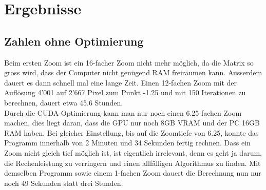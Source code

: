 \section{Ergebnisse}

\subsection{Zahlen ohne Optimierung}
Beim ersten Zoom ist ein 16-facher Zoom nicht mehr möglich, da die Matrix so gross wird, dass der Computer nicht genügend RAM freiräumen kann. Ausserdem dauert es dann schnell mal eine lange Zeit. Einen 12-fachen Zoom mit der Auflösung 4'001 auf 2'667 Pixel zum Punkt -1.25 und mit 150 Iterationen zu berechnen, dauert etwa 45.6 Stunden.\\
Durch die CUDA-Optimierung kann man nur noch einen 6.25-fachen Zoom machen, dies liegt daran, dass die GPU nur noch 8GB VRAM und der PC 16GB RAM haben. Bei gleicher Einstellung, bis auf die Zoomtiefe von 6.25, konnte das Programm innerhalb von 2 Minuten und 34 Sekunden fertig rechnen. Dass ein Zoom nicht gleich tief möglich ist, ist eigentlich irrelevant, denn es geht ja darum, die Rechenleistung zu verringern und einen allfälligen Algorithmus zu finden. Mit demselben Programm sowie einem 1-fachen Zoom dauert die Berechnung nun nur noch 49 Sekunden statt drei Stunden.

